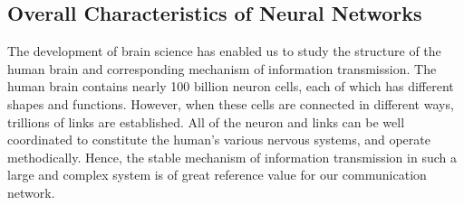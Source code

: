 \documentclass[journal,comsoc]{IEEEtran}
\begin{document}
		\subsection{Overall Characteristics of Neural Networks}
			The development of brain science has enabled us to study the structure of the human brain and corresponding mechanism of information transmission.
			The human brain contains nearly 100 billion neuron cells, each of which has different shapes and functions.
			However, when these cells are connected in different ways, trillions of links are established.
			All of the neuron and links can be well coordinated to constitute the human's various nervous systems, and operate methodically.
			Hence, the stable mechanism of information transmission in such a large and complex system is of great reference value for our communication network.
\end{document}

